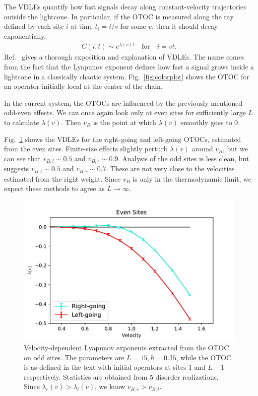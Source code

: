 \documentclass[aps,prx,reprint,superscriptaddress, longbibliography]{revtex4-1}
\newcommand{\charlie}[1]{{\color{Magenta}{{#1}}}}
\begin{document}
The VDLEs quantify how fast signals decay along constant-velocity trajectories outside the lightcone. In particular, if the OTOC is measured along the ray defined by each site $i$ at time $t_i = i/v$ for some $v$, then it should decay exponentially,
\begin{align}
	C(i, t) \sim e^{\lambda(v)t}\quad\text{for}\quad i = vt.
\end{align}
Ref.~\cite{Khemani2018lambda} gives a thorough exposition and explanation of VDLEs. The name comes from the fact that the Lyapunov exponent defines how fast a signal grows inside a lightcone in a classically chaotic system. Fig.~\ref{fig:colorplot} shows the OTOC for an operator initially local at the center of the chain.

In the current system, the OTOCs are influenced by the previously-mentioned odd-even effects. We can once again look only at even sites for sufficiently large $L$ to calculate $\lambda(v)$. Then $v_B$ is the point at which $\lambda(v)$ smoothly goes to 0.

Fig.~\ref{fig:vdle} shows the VDLEs for the right-going and left-going OTOCs, estimated from the even sites. Finite-size effects slightly perturb $\lambda(v)$ around $v_B$, but we can see that $v_{B,l} \sim 0.5$ and $v_{B,r} \sim 0.9$. Analysis of the odd sites is less clean, but suggests $v_{B,l} \sim 0.5$ and $v_{B,r} \sim 0.7$.
These are not very close to the velocities estimated from the right weight. Since $v_B$ is \charlie{well defined} only in the thermodynamic limit, we expect these methods to agree as $L\to\infty$.

\begin{figure}
	\includegraphics[width=\columnwidth]{vdle}
	\caption{Velocity-dependent Lyapunov exponents extracted from the OTOC on odd sites. The parameters are $L=15, h=0.35$, while the OTOC is as defined in the text with initial operators at sites 1 and $L-1$ respectively. Statistics are obtained from 5 disorder realizations. Since $\lambda_r(v)>\lambda_l(v)$, we know $v_{B,r}>v_{B,l}$.}
	\label{fig:vdle}
\end{figure}
\end{document}
